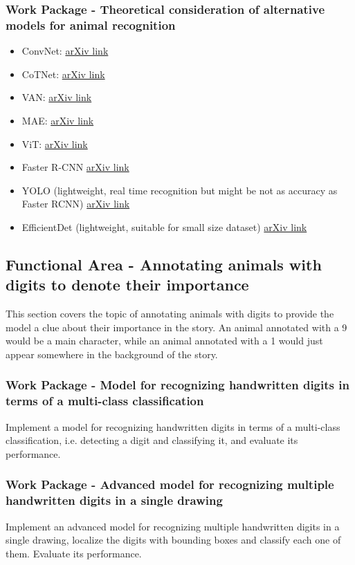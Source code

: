 \subsubsection{Work Package - Theoretical consideration of alternative models for animal recognition}
\begin{itemize}
	\item ConvNet: \href{https://arxiv.org/abs/2201.03545}{arXiv link}
	\item CoTNet: \href{https://arxiv.org/abs/2107.12292}{arXiv link}
	\item VAN: \href{https://arxiv.org/abs/2202.09741}{arXiv link}
	\item MAE: \href{https://arxiv.org/abs/2111.06377}{arXiv link}
	\item ViT: \href{https://arxiv.org/abs/2010.11929}{arXiv link}
	\item Faster R-CNN \href{https://arxiv.org/abs/1506.01497}{arXiv link}
	\item YOLO (lightweight, real time recognition but might be not as accuracy as Faster RCNN) \href{https://arxiv.org/abs/1506.02640}{arXiv link}
	\item EfficientDet (lightweight, suitable for small size dataset) \href{https://arxiv.org/abs/1911.09070}{arXiv link}
\end{itemize}



\subsection{Functional Area - Annotating animals with digits to denote their importance}
This section covers the topic of annotating animals with digits to provide the model a clue about their importance in the story. An animal annotated with a 9 would be a main character, while an animal annotated with a 1 would just appear somewhere in the background of the story.

\subsubsection{Work Package - Model for recognizing handwritten digits in terms of a multi-class classification}
Implement a model for recognizing handwritten digits in terms of a multi-class classification, i.e. detecting a digit and classifying it, and evaluate its performance.

\subsubsection{Work Package - Advanced model for recognizing multiple handwritten digits in a single drawing}
Implement an advanced model for recognizing multiple handwritten digits in a single drawing, localize the digits with bounding boxes and classify each one of them. Evaluate its performance.

